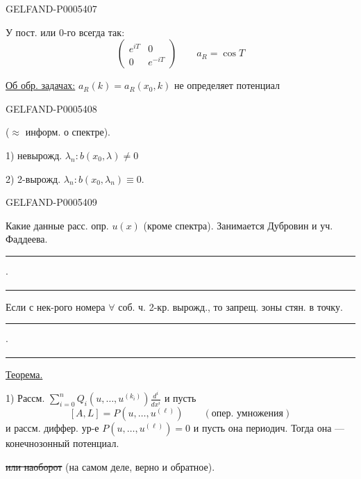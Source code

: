 \begin{GelfandAdjacentEvidence}{GELFAND-P000540}{7}

У пост. или 0-го всегда так:
\[
\begin{pmatrix}e^{iT}&0\\0&e^{-iT}\end{pmatrix}\qquad a_R=\cos T
\]

\uline{Об обр. задачах:} \(a_R(k)=a_R(x_0,k)\) не определяет потенциал
\end{GelfandAdjacentEvidence}
\begin{GelfandAdjacentEvidence}{GELFAND-P000540}{8}

(\(\approx\) информ. о спектре).

1) невырожд. \(\lambda_n\colon b(x_0,\lambda)\ne0\)

2) 2-вырожд. \(\lambda_n\colon b(x_0,\lambda_n)\equiv0\).
\end{GelfandAdjacentEvidence}
\begin{GelfandAdjacentEvidence}{GELFAND-P000540}{9}


Какие данные расс. опр. \(u(x)\) (кроме спектра). Занимается Дубровин и уч. Фаддеева.
\hfill\rule{1.08cm}{.35pt}\enspace\(\cdot\)\enspace\rule{1.08cm}{.35pt}\par

Если с нек-рого номера \(\forall\) соб. ч. 2-кр. вырожд., то запрещ. зоны стян. в точку.
\hfill\rule{1.08cm}{.35pt}\enspace\(\cdot\)\enspace\rule{1.08cm}{.35pt}\par

\uline{Теорема.}

1) Рассм. \(\displaystyle\sum_{i=0}^n Q_i(u,\ldots,u^{(k_i)})\frac{d^i}{dx^i}\) и пусть
\[
[A,L]=P(u,\ldots,u^{(\ell)})\qquad(\text{опер. умножения})
\]
и рассм. диффер. ур-е \(P(u,\ldots,u^{(\ell)})=0\) и пусть она периодич.
Тогда она — конечнозонный потенциал.

\sout{или наоборот} (на самом деле, верно и обратное).
\end{GelfandAdjacentEvidence}



